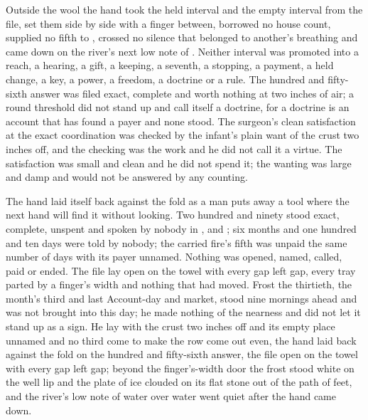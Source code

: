 Outside the wool the hand took the held interval and the empty interval from the file, set them side by side with a finger between, borrowed no house count, supplied no fifth to , crossed no silence that belonged to another's breathing and came down on the river's next low note of . Neither interval was promoted into a reach, a hearing, a gift, a keeping, a seventh, a stopping, a payment, a held change, a key, a power, a freedom, a doctrine or a rule. The hundred and fifty-sixth answer was filed exact, complete and worth nothing at two inches of air; a round threshold did not stand up and call itself a doctrine, for a doctrine is an account that has found a payer and none stood. The surgeon's clean satisfaction at the exact coordination was checked by the infant's plain want of the crust two inches off, and the checking was the work and he did not call it a virtue. The satisfaction was small and clean and he did not spend it; the wanting was large and damp and would not be answered by any counting.

The hand laid itself back against the fold as a man puts away a tool where the next hand will find it without looking. Two hundred and ninety stood exact, complete, unspent and spoken by nobody in ,  and ; six months and one hundred and ten days were told by nobody; the carried fire's fifth was unpaid the same number of days with its payer unnamed. Nothing was opened, named, called, paid or ended. The file lay open on the towel with every gap left gap, every tray parted by a finger's width and nothing that had moved. Frost the thirtieth, the month's third and last Account-day and market, stood nine mornings ahead and was not brought into this day; he made nothing of the nearness and did not let it stand up as a sign. He lay with the crust two inches off and its empty place unnamed and no third come to make the row come out even, the hand laid back against the fold on the hundred and fifty-sixth answer, the file open on the towel with every gap left gap; beyond the finger's-width door the frost stood white on the well lip and the plate of ice clouded on its flat stone out of the path of feet, and the river's low note of water over water went quiet after the hand came down.
